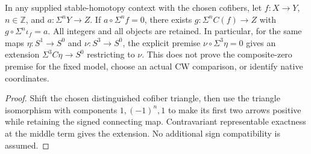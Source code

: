 \begin{proposition}
  \label{prop:shifted-cofiber-extension}
  \leanok
  In any supplied stable-homotopy context with the chosen cofibers, let
  $f:X\to Y$, $n\in\mathbb Z$, and $a:\Sigma^nY\to Z$. If
  $a\circ\Sigma^nf=0$, there exists $g:\Sigma^nC(f)\to Z$ with
  $g\circ\Sigma^n\iota_f=a$. All integers and all objects are retained.
  In particular, for the same maps $\eta:S^1\to S^0$ and
  $\nu:S^3\to S^0$, the explicit premise
  $\nu\circ\Sigma^3\eta=0$ gives an extension
  $\Sigma^3C\eta\to S^0$ restricting to $\nu$.
  This does not prove the composite-zero premise for the fixed model,
  choose an actual CW comparison, or identify native coordinates.
\end{proposition}
\begin{proof}
  \leanok
  Shift the chosen distinguished cofiber triangle, then use the triangle
  isomorphism with components $1,(-1)^n,1$ to make its first two arrows
  positive while retaining the signed connecting map. Contravariant
  representable exactness at the middle term gives the extension.
  No additional sign compatibility is assumed.
\end{proof}

